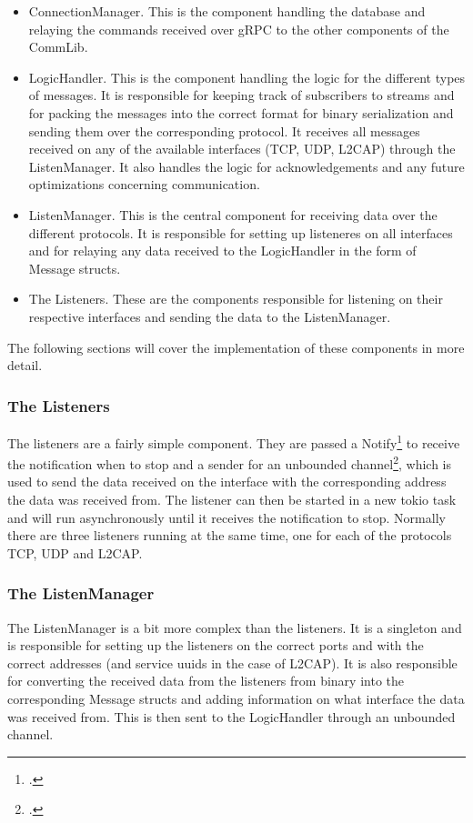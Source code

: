 \begin{itemize}
  \item ConnectionManager. This is the component handling the database and relaying the commands received over gRPC to the other components of the CommLib.
  \item LogicHandler. This is the component handling the logic for the different types of messages. It is responsible for keeping track of subscribers to streams
  and for packing the messages into the correct format for binary serialization and sending them over the corresponding protocol. It receives all messages received on
  any of the available interfaces (TCP, UDP, L2CAP) through the ListenManager. It also handles the logic for 
  acknowledgements and any future optimizations concerning communication.
  \item ListenManager. This is the central component for receiving data over the different protocols. It is responsible for setting up listeneres on all interfaces and
  for relaying any data received to the LogicHandler in the form of Message structs.
  \item The Listeners. These are the components responsible for listening on their respective interfaces and sending the data to the ListenManager. 
\end{itemize}

The following sections will cover the implementation of these components in more detail.

\subsubsection{The Listeners}
The listeners are a fairly simple component. They are passed a Notify\footcite{rust-notify} to receive the notification when to stop and a sender for an unbounded channel\footcite{rust-unbounded-channel}, 
which is used to send the data received on the interface with the corresponding address the data was received from. 
The listener can then be started in a new tokio task and will run asynchronously until it receives the notification to stop.
Normally there are three listeners running at the same time, one for each of the protocols TCP, UDP and L2CAP.

\subsubsection{The ListenManager}
The ListenManager is a bit more complex than the listeners. It is a singleton and is responsible for setting up the listeners on the correct ports and with the correct addresses
(and service uuids in the case of L2CAP). It is also responsible for converting the received data from the listeners from binary into the corresponding Message structs and adding
information on what interface the data was received from. This is then sent to the LogicHandler through an unbounded channel.

